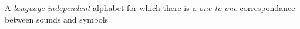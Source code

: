 A \emph{language independent} alphabet for which there is a \emph{one-to-one} correspondance between sounds and symbols
